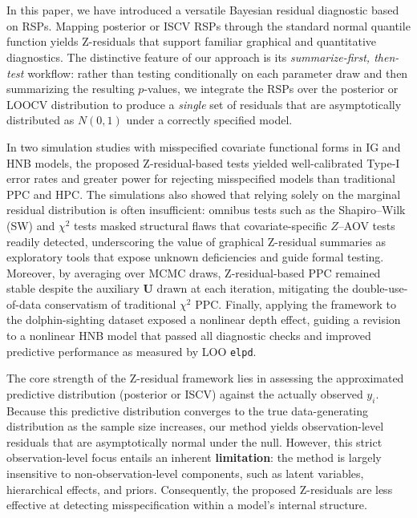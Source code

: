 \section{}\label{concl}

In this paper, we have introduced a versatile Bayesian residual diagnostic
based on RSPs. Mapping posterior or ISCV RSPs through the standard normal
quantile function yields Z-residuals that support familiar graphical and
quantitative diagnostics. The distinctive feature of our approach is its
\emph{summarize-first, then-test} workflow: rather than testing
conditionally on each parameter draw and then summarizing the resulting
$p$-values, we integrate the RSPs over
the posterior or LOOCV distribution to produce a
\emph{single} set of residuals that are asymptotically distributed as
 $N(0,1)$ under a correctly specified model.

In two simulation studies with misspecified covariate functional forms in
IG and HNB models, the proposed Z-residual-based tests yielded well-calibrated Type-I error
rates and greater power for rejecting misspecified models than traditional
PPC and HPC. The simulations also showed that relying solely on the
marginal residual distribution is often insufficient: omnibus tests such as
the Shapiro--Wilk (SW) and $\chi^2$ tests masked structural flaws that
covariate-specific $Z$--AOV tests readily detected, underscoring the value
of graphical Z-residual summaries as exploratory tools that expose unknown
deficiencies and guide formal testing. Moreover, by averaging over MCMC
draws, Z-residual-based PPC remained stable despite the auxiliary $\bm{U}$
drawn at each iteration, mitigating the double-use-of-data conservatism of
traditional $\chi^2$ PPC. Finally, applying the framework to the
dolphin-sighting dataset exposed a nonlinear depth effect, guiding a
revision to a nonlinear HNB model that passed all diagnostic checks and
improved predictive performance as measured by LOO \texttt{elpd}.

The core strength of the Z-residual framework lies in assessing the approximated predictive distribution (posterior or ISCV) against the actually observed $y_i$. Because this predictive distribution converges to the true data-generating distribution as the sample size increases, our method yields observation-level residuals that are asymptotically normal under the null. However, this strict observation-level focus entails an inherent \textbf{limitation}: the method is largely insensitive to non-observation-level components, such as latent variables, hierarchical effects, and priors. Consequently, the proposed Z-residuals are less effective at detecting misspecification within a model's internal structure.

